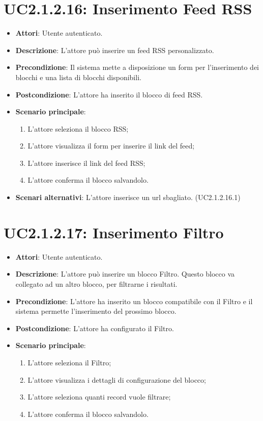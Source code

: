 \section{UC2.1.2.16: Inserimento Feed RSS}
\label{UC2.1.2.16}
\begin{itemize}
	\item \textbf{Attori}: Utente autenticato.
	\item \textbf{Descrizione}: L'attore può inserire un feed RSS personalizzato.
	\item \textbf{Precondizione}: Il sistema mette a disposizione un form per l'inserimento dei blocchi e una lista di blocchi disponibili.
	\item \textbf{Postcondizione}: L'attore ha inserito il blocco di feed RSS.
	\item \textbf{Scenario principale}:
	\begin{enumerate} \item L'attore seleziona il blocco RSS; \item L'attore visualizza il form per inserire il link del feed; \item  L'attore inserisce il link del feed RSS; \item L'attore conferma il blocco salvandolo.\end{enumerate}
	\item \textbf{Scenari alternativi}:
	L'attore inserisce un url sbagliato. (UC2.1.2.16.1)
\end{itemize}


\section{UC2.1.2.17: Inserimento Filtro}
\label{UC2.1.2.17}
\begin{itemize}
	\item \textbf{Attori}: Utente autenticato.
	\item \textbf{Descrizione}: L'attore può inserire un blocco Filtro. Questo blocco va collegato ad un altro blocco, per filtrarne i risultati. 
	\item \textbf{Precondizione}: L'attore ha inserito un blocco compatibile con il Filtro e il sistema permette l'inserimento del prossimo blocco.
	\item \textbf{Postcondizione}: L'attore ha configurato il Filtro. 
	\item \textbf{Scenario principale}:
	\begin{enumerate} \item L'attore seleziona il Filtro; \item L'attore visualizza i dettagli di configurazione del blocco; \item  L'attore seleziona quanti record vuole filtrare; \item L'attore conferma il blocco salvandolo.\end{enumerate}
\end{itemize}


